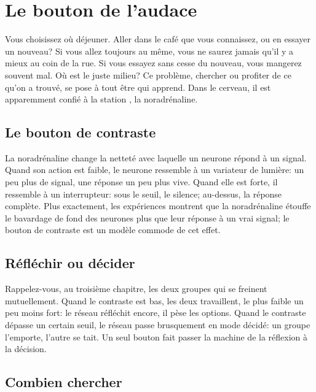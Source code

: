 \chapter{Le bouton de l'audace}

Vous choisissez où déjeuner. Aller dans le café que vous connaissez, ou en essayer un nouveau? Si vous allez toujours au même, vous ne saurez jamais qu'il y a mieux au coin de la rue. Si vous essayez sans cesse du nouveau, vous mangerez souvent mal. Où est le juste milieu? Ce problème, chercher ou profiter de ce qu'on a trouvé, se pose à tout être qui apprend. Dans le cerveau, il est apparemment confié à la station , la noradrénaline.

\section*{Le bouton de contraste}

La noradrénaline change la netteté avec laquelle un neurone répond à un signal. Quand son action est faible, le neurone ressemble à un variateur de lumière: un peu plus de signal, une réponse un peu plus vive. Quand elle est forte, il ressemble à un interrupteur: sous le seuil, le silence; au-dessus, la réponse complète. Plus exactement, les expériences montrent que la noradrénaline étouffe le bavardage de fond des neurones plus que leur réponse à un vrai signal; le \og bouton de contraste\fg{} est un modèle commode de cet effet.


\section*{Réfléchir ou décider}

Rappelez-vous, au troisième chapitre, les deux groupes qui se freinent mutuellement. Quand le contraste est bas, les deux travaillent, le plus faible un peu moins fort: le réseau \og réfléchit\fg{} encore, il pèse les options. Quand le contraste dépasse un certain seuil, le réseau passe brusquement en mode \og décidé\fg{}: un groupe l'emporte, l'autre se tait. Un seul bouton fait passer la machine de la réflexion à la décision.

\section*{Combien chercher}

